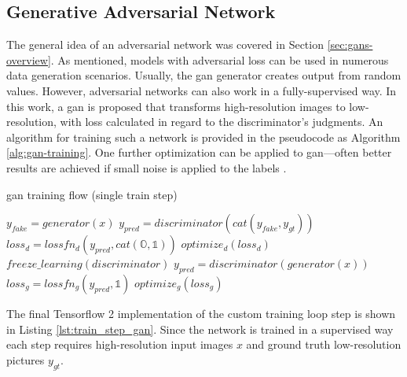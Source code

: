 \subsection{Generative Adversarial Network}
The general idea of an adversarial network was covered in Section \ref{sec:gans-overview}.
As mentioned, models with adversarial loss can be used in numerous data generation scenarios.
Usually, the \gls{gan} generator creates output from random values.
However, adversarial networks can also work in a fully-supervised way.
In this work, a \gls{gan} is proposed that transforms high-resolution images to low-resolution, with loss calculated in regard to the discriminator's judgments.
An algorithm for training such a network is provided in the pseudocode as Algorithm \ref{alg:gan-training}.
One further optimization can be applied to \gls{gan}---often better results are achieved if small noise is applied to the labels \cite{sonderby-2016-gannoise}.
\begin{algorithm}
\caption{\gls{gan} training flow (single train step)}
\label{alg:gan-training}
\begin{algorithmic}
	\STATE $ y_{fake} = generator(x) $
	\STATE $ y_{pred} = discriminator(cat(y_{fake}, y_{gt})) $
	\STATE $ loss_d = lossfn_d(y_{pred}, cat(\mathds{O}, \mathds{1})) $
	\STATE $ optimize_d(loss_d) $
	\STATE $ freeze\_learning(discriminator) $
	\STATE $ y_{pred} = discriminator(generator(x)) $
	\STATE $ loss_g = lossfn_g(y_{pred}, \mathds{1}) $
	\STATE $ optimize_g(loss_g) $
\end{algorithmic}
\end{algorithm}

The final Tensorflow 2 implementation of the custom training loop step is shown in Listing \ref{lst:train_step_gan}.
Since the network is trained in a supervised way each step requires high-resolution input images $ x $ and ground truth low-resolution pictures $ y_{gt} $.

